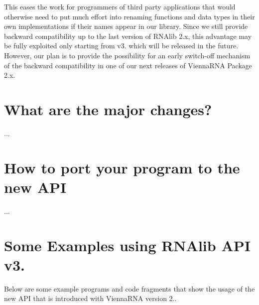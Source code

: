 This eases the work for programmers of third party applications that would otherwise need to put much effort into renaming functions and data types in their own implementations if their names appear in our library. Since we still provide backward compatibility up to the last version of R\+N\+Alib 2.\+x, this advantage may be fully exploited only starting from v3. which will be released in the future. However, our plan is to provide the possibility for an early switch-\/off mechanism of the backward compatibility in one of our next releases of Vienna\+R\+N\+A Package 2.\+x.\hypertarget{newAPI_newAPI_changes}{}\section{What are the major changes?}\label{newAPI_newAPI_changes}
...\hypertarget{newAPI_newAPI_porting}{}\section{How to port your program to the new A\+P\+I}\label{newAPI_newAPI_porting}
...\hypertarget{newAPI_newAPI_examples}{}\section{Some Examples using R\+N\+Alib A\+P\+I v3.}\label{newAPI_newAPI_examples}
Below are some example programs and code fragments that show the usage of the new A\+P\+I that is introduced with Vienna\+R\+N\+A version 2..


